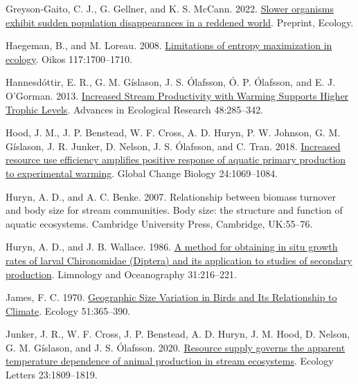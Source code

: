 \documentclass[
]{article}
\newlength{\cslhangindent}
\newlength{\cslentryspacingunit} %
\newenvironment{CSLReferences}[2] %
 {%
  \setlength{\parindent}{0pt}
  \ifodd #1
  \let\oldpar\par
  \def\par{\hangindent=\cslhangindent\oldpar}
  \fi
  \setlength{\parskip}{#2\cslentryspacingunit}
 }%
 {}
\begin{document}
\begin{CSLReferences}{1}{0}
\leavevmode{}%
Greyson-Gaito, C. J., G. Gellner, and K. S. McCann. 2022.
\href{https://doi.org/10.1101/2022.01.27.478031}{Slower organisms
exhibit sudden population disappearances in a reddened world}. Preprint,
{Ecology}.

\leavevmode{}%
Haegeman, B., and M. Loreau. 2008.
\href{https://doi.org/10.1111/j.1600-0706.2008.16539.x}{Limitations of
entropy maximization in ecology}. Oikos 117:1700--1710.

\leavevmode{}%
Hannesdóttir, E. R., G. M. Gíslason, J. S. Ólafsson, Ó. P. Ólafsson, and
E. J. O'Gorman. 2013.
\href{https://doi.org/10.1016/B978-0-12-417199-2.00005-7}{Increased
{Stream Productivity} with {Warming Supports Higher Trophic Levels}}.
Advances in Ecological Research 48:285--342.

\leavevmode{}%
Hood, J. M., J. P. Benstead, W. F. Cross, A. D. Huryn, P. W. Johnson, G.
M. Gíslason, J. R. Junker, D. Nelson, J. S. Ólafsson, and C. Tran. 2018.
\href{https://doi.org/10.1111/gcb.13912}{Increased resource use
efficiency amplifies positive response of aquatic primary production to
experimental warming}. Global Change Biology 24:1069--1084.

\leavevmode{}%
Huryn, A. D., and A. C. Benke. 2007. Relationship between biomass
turnover and body size for stream communities. Body size: the structure
and function of aquatic ecosystems. Cambridge University Press,
Cambridge, UK:55--76.

\leavevmode{}%
Huryn, A. D., and J. B. Wallace. 1986.
\href{https://doi.org/10.4319/lo.1986.31.1.0216}{A method for obtaining
in situ growth rates of larval {Chironomidae} ({Diptera}) and its
application to studies of secondary production}. Limnology and
Oceanography 31:216--221.

\leavevmode{}%
James, F. C. 1970. \href{https://doi.org/10.2307/1935374}{Geographic
{Size Variation} in {Birds} and {Its Relationship} to {Climate}}.
Ecology 51:365--390.

\leavevmode{}%
Junker, J. R., W. F. Cross, J. P. Benstead, A. D. Huryn, J. M. Hood, D.
Nelson, G. M. Gíslason, and J. S. Ólafsson. 2020.
\href{https://doi.org/10.1111/ele.13608}{Resource supply governs the
apparent temperature dependence of animal production in stream
ecosystems}. Ecology Letters 23:1809--1819.


\end{CSLReferences}
\end{document}
